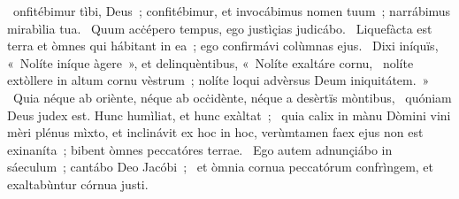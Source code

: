 \psalmChapterWithInscription{}
{ }
{%
~onfitébimur tìbi, Deus~; confitébimur, et invocábimus nomen tuum~; narrábimus mirabìlia tua. 
~Quum acċépero tempus, ego justìçias judicábo. 
~Liquefàcta est terra et òmnes qui hábitant in ea~; ego confirmávi colùmnas ejus. 
~Dixi iníquïs, «~Nolíte iníque àgere~», et delinquèntibus, «~Nolíte exaltáre cornu, 
~nolíte extòllere in altum cornu vèstrum~; nolíte loqui advèrsus Deum iniquitátem.~»
~Quia néque ab oriènte, néque ab ocċidènte, néque a desèrtïs mòntibus, 
~quóniam Deus judex est. Hunc humìliat, et hunc exàltat~; 
~quia calix in mànu Dòmini vini mèri plénus mìxto, et inclinávit ex hoc in hoc, verùmtamen faex ejus non est exinaníta~; bibent òmnes peccatóres terrae. 
~Ego autem adnunçiábo in sáeculum~; cantábo Deo Jacóbi~; 
~et òmnia cornua peccatórum confrìngem, et exaltabùntur córnua justi. 
}
